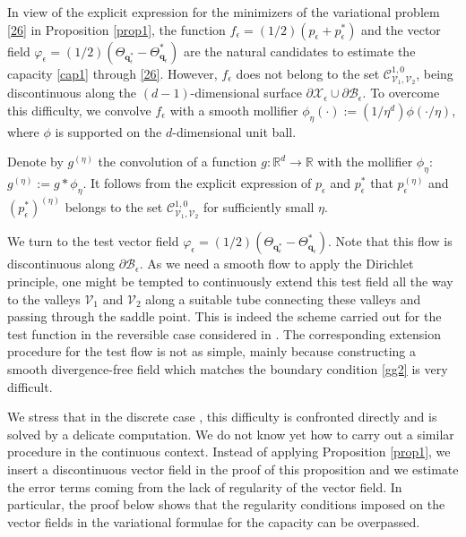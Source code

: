 \documentclass[reqno]{amsart}
\newcounter{as}[section]
\newcommand{\mc}[1]{{\mathcal #1}}
\newcommand{\bb}[1]{{\mathbb #1}}
\newcommand{\bs}[1]{{\boldsymbol #1}}
\newcommand{\<}{\langle}
\renewcommand{\>}{\rangle}
\begin{document}
In view of the explicit expression for the minimizers of the
variational problem \eqref{26} in Proposition \ref{prop1}, the
function $f_{\epsilon}= (1/2) (p_{\epsilon}+ p_{\epsilon}^{*})$ and
the vector field $\varphi_{\epsilon}=(1/2)
(\Theta_{\bs{q}_{\epsilon}^{*}} - \Theta_{\bs{q}_{\epsilon}}^{*})$ are
the natural candidates to estimate the capacity \eqref{cap1} through
\eqref{26}. However, $f_{\epsilon}$ does not belong to the set
$\mc{C}_{\mc{V}_{1},\mc{V}_{2}}^{1,0}$, being discontinuous along the
$(d-1)$-dimensional surface $\partial\mc{X}_{\epsilon}
\cup \partial\mc{B}_{\epsilon}$.  To overcome this difficulty, we
convolve $f_{\epsilon}$ with a smooth mollifier $\phi_{\eta}(\cdot) :=
(1/\eta^{d}) \phi(\cdot/\eta)$, where $\phi$ is supported on the
$d$-dimensional unit ball.

Denote by $g^{(\eta)}$ the convolution of a function
$g:\bb R^d\rightarrow\bb{R}$ with the mollifier $\phi_{\eta}$:
$g^{(\eta)}:=g*\phi_{\eta}$.  It follows from the explicit expression
of $p_\epsilon$ and $p_\epsilon^*$ that $p_{\epsilon}^{(\eta)}$ and
$(p_{\epsilon}^*)^{(\eta)}$ belongs to the set
$\mc{C}_{\mc{V}_{1} , \mc{V}_{2}}^{1,0}$ for sufficiently small
$\eta$.

We turn to the test vector field
$\varphi_{\epsilon} = (1/2) (\Theta_{\bs{q}_{\epsilon}^{*}} -
\Theta_{\bs{q}_{\epsilon}}^{*})$.
Note that this flow is discontinuous along
$\partial\mc{B}_{\epsilon}$. As we need a smooth flow to apply the
Dirichlet principle, one might be tempted to continuously extend this
test field all the way to the valleys $\mathcal{V}_1$ and
$\mathcal{V}_2$ along a suitable tube connecting these valleys and
passing through the saddle point. This is indeed the scheme carried
out for the test function in the reversible case considered in
\cite{BEGK1}. The corresponding extension procedure for the test flow
is not as simple, mainly because constructing a smooth divergence-free
field which matches the boundary condition \eqref{gg2} is very
difficult.

We stress that in the discrete case \cite{LS1}, this difficulty is
confronted directly and is solved by a delicate computation. We do not
know yet how to carry out a similar procedure in the continuous
context. Instead of applying Proposition \ref{prop1}, we insert a
discontinuous vector field in the proof of this proposition
and we estimate the error terms coming from the lack of regularity of
the vector field. In particular, the proof below shows that the
regularity conditions imposed on the vector fields in the variational
formulae for the capacity can be overpassed.
\end{document}
